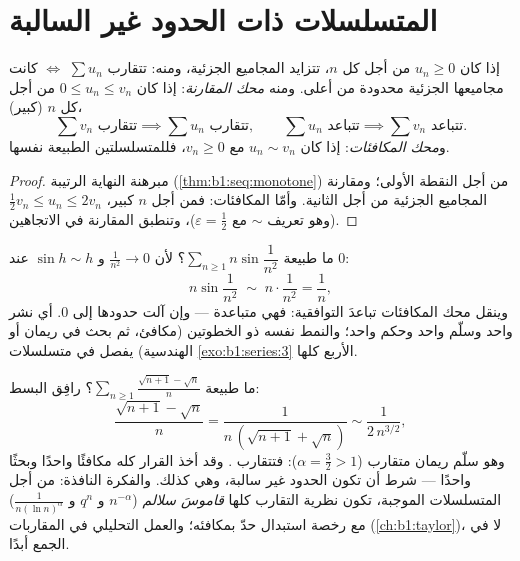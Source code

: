 \section{المتسلسلات ذات الحدود غير السالبة}

\begin{theorem}\label{thm:b1:series:positive}
إذا كان $u_n \geq 0$ من أجل كل $n$، تتزايد المجاميع الجزئية، ومنه: تتقارب $\sum
u_n$ $\iff$ كانت مجاميعها الجزئية محدودة من أعلى. ومنه
\emph{محك المقارنة}: إذا كان $0 \leq u_n \leq v_n$ من أجل كل $n$ (كبير)،
\[
\sum v_n \text{ تتقارب} \implies \sum u_n \text{ تتقارب},
\qquad
\sum u_n \text{ تتباعد} \implies \sum v_n \text{ تتباعد}.
\]
و\emph{محك المكافئات}: إذا كان $u_n \sim v_n$ مع $v_n \geq
0$، فللمتسلسلتين الطبيعة نفسها.
\end{theorem}

\begin{proof}
مبرهنة النهاية الرتيبة (\cref{thm:b1:seq:monotone}) من أجل النقطة
الأولى؛ ومقارنة المجاميع الجزئية من أجل الثانية. وأمّا المكافئات: فمن أجل
$n$ كبير، $\frac12 v_n \leq u_n \leq 2 v_n$ (وهو تعريف $\sim$
مع $\varepsilon = \frac12$)، وتنطبق المقارنة في الاتجاهين.
\end{proof}

\begin{example}\label{ex:b1:series:equivdiverge}
ما طبيعة $\sum_{n\geq1} n\sin\dfrac{1}{n^2}$؟ لأن
$\frac{1}{n^2} \to 0$ و $\sin h \sim h$ عند $0$:
\[
n\sin\frac{1}{n^2} \;\sim\; n\cdot\frac{1}{n^2} = \frac1n ,
\]
وينقل محك المكافئات تباعدَ
 التوافقية: فهي متباعدة --- وإن آلت حدودها إلى
$0$. أي نشر واحد وسلّم واحد وحكم واحد؛ والنمط
نفسه ذو الخطوتين (مكافئ، ثم بحث في ريمان أو الهندسية) يفصل
في متسلسلات \cref{exo:b1:series:3} الأربع كلها.
\end{example}

\begin{example}\label{ex:b1:series:equivtest}
ما طبيعة $\sum_{n \geq 1} \frac{\sqrt{n+1} - \sqrt n}{n}$؟
رافِق البسط:
\[
\frac{\sqrt{n+1} - \sqrt n}{n}
= \frac{1}{n\,(\sqrt{n+1} + \sqrt n)}
\sim \frac{1}{2\,n^{3/2}} ,
\]
وهو سلّم ريمان متقارب ($\alpha = \frac32 > 1$): فتتقارب .
وقد أخذ القرار كله مكافئًا واحدًا وبحثًا واحدًا
--- شرط أن تكون الحدود غير سالبة، وهي كذلك. والفكرة
النافذة: من أجل المتسلسلات الموجبة، تكون نظرية التقارب كلها
\emph{قاموسَ سلالم} ($n^{-\alpha}$ و $q^n$ و
$\frac{1}{n(\ln n)^\alpha}$) مع رخصة استبدال حدّ
بمكافئه؛ والعمل التحليلي في المقاربات
(\cref{ch:b1:taylor})، لا في الجمع أبدًا.
\end{example}


